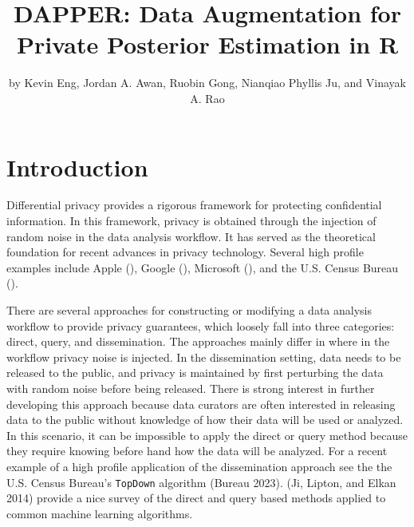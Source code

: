 \title{DAPPER: Data Augmentation for Private Posterior Estimation in R}


\author{by Kevin Eng, Jordan A. Awan, Ruobin Gong, Nianqiao Phyllis Ju, and Vinayak A. Rao}

\maketitle


\hypertarget{introduction}{%
\section{Introduction}\label{introduction}}

Differential privacy provides a rigorous framework for protecting
confidential information. In this framework, privacy is obtained
through the injection of random noise in the data analysis workflow.
It has served as the theoretical foundation for recent advances in privacy technology. Several high profile
examples include Apple (), Google (), Microsoft (), and the
U.S. Census Bureau ().

There are several approaches for constructing or modifying a data analysis workflow
to provide privacy guarantees, which loosely fall into three categories: direct, query, and dissemination.
The approaches mainly differ in where in the workflow privacy noise is injected.
In the dissemination setting, data needs to be released to the public, and privacy is maintained by first
perturbing the data with random noise before being released. There is strong interest
in further developing this approach because data curators are often interested
in releasing data to the public without knowledge of how their data will
be used or analyzed. In this scenario, it can be impossible to apply the direct or
query method because they require knowing before hand how the data will be analyzed.
For a recent example of a high profile application of the dissemination approach
see the the U.S. Census Bureau's \texttt{TopDown} algorithm (Bureau 2023). (Ji, Lipton, and Elkan 2014)
provide a nice survey of the direct and query based methods applied to
common machine learning algorithms.

